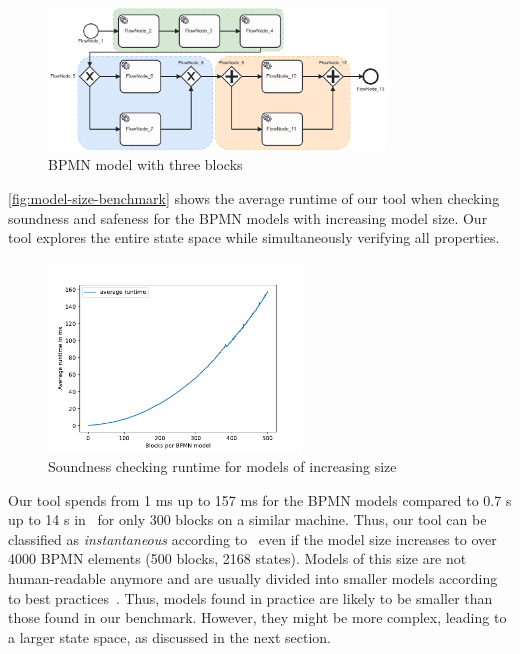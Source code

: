 \documentclass[runningheads]{llncs}
\begin{document}
\begin{figure}[ht]
	\centering
	\includegraphics[width=0.8\textwidth]{images/three-blocks}
	\caption{BPMN model with three blocks~\cite{krauterHigherorderTransformationApproach2023}}
	\label{fig:three-block-example}
\end{figure}

\autoref{fig:model-size-benchmark} shows the average runtime of our tool when checking soundness and safeness for the BPMN models with increasing model size.
Our tool explores the entire state space while simultaneously verifying all properties.

\begin{figure}[ht]
	\centering
	\includegraphics[width=0.6\textwidth]{images/model-size-benchmark}
	\caption{Soundness checking runtime for models of increasing size}
	\label{fig:model-size-benchmark}
\end{figure}

Our tool spends from 1 ms up to 157 ms for the BPMN models compared to 0.7 s up to 14 s in~\cite{krauterHigherorderTransformationApproach2023} for only 300 blocks on a similar machine.
Thus, our tool can be classified as \textit{instantaneous} according to~\cite{fahlandAnalysisDemandInstantaneous2011} even if the model size increases to over 4000 BPMN elements (500 blocks, 2168 states).
Models of this size are not human-readable anymore and are usually divided into smaller models according to best practices~\cite{fahlandAnalysisDemandInstantaneous2011}.
Thus, models found in practice are likely to be smaller than those found in our benchmark.
However, they might be more complex, leading to a larger state space, as discussed in the next section.
\end{document}
